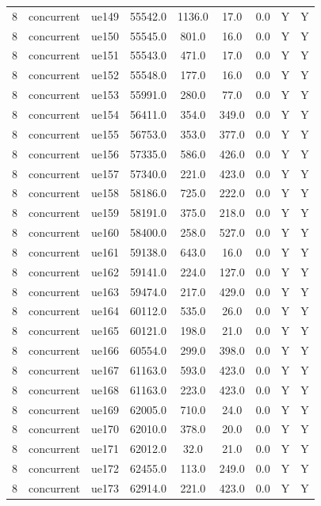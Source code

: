 \begin{table}[ht]
\begin{tabular}{|c|c|c|c|c|c|c|c|c|}
8 & concurrent & ue149 & 55542.0 & 1136.0 & 17.0 & 0.0 & Y & Y \\
8 & concurrent & ue150 & 55545.0 & 801.0 & 16.0 & 0.0 & Y & Y \\
8 & concurrent & ue151 & 55543.0 & 471.0 & 17.0 & 0.0 & Y & Y \\
8 & concurrent & ue152 & 55548.0 & 177.0 & 16.0 & 0.0 & Y & Y \\
8 & concurrent & ue153 & 55991.0 & 280.0 & 77.0 & 0.0 & Y & Y \\
8 & concurrent & ue154 & 56411.0 & 354.0 & 349.0 & 0.0 & Y & Y \\
8 & concurrent & ue155 & 56753.0 & 353.0 & 377.0 & 0.0 & Y & Y \\
8 & concurrent & ue156 & 57335.0 & 586.0 & 426.0 & 0.0 & Y & Y \\
8 & concurrent & ue157 & 57340.0 & 221.0 & 423.0 & 0.0 & Y & Y \\
8 & concurrent & ue158 & 58186.0 & 725.0 & 222.0 & 0.0 & Y & Y \\
8 & concurrent & ue159 & 58191.0 & 375.0 & 218.0 & 0.0 & Y & Y \\
8 & concurrent & ue160 & 58400.0 & 258.0 & 527.0 & 0.0 & Y & Y \\
8 & concurrent & ue161 & 59138.0 & 643.0 & 16.0 & 0.0 & Y & Y \\
8 & concurrent & ue162 & 59141.0 & 224.0 & 127.0 & 0.0 & Y & Y \\
8 & concurrent & ue163 & 59474.0 & 217.0 & 429.0 & 0.0 & Y & Y \\
8 & concurrent & ue164 & 60112.0 & 535.0 & 26.0 & 0.0 & Y & Y \\
8 & concurrent & ue165 & 60121.0 & 198.0 & 21.0 & 0.0 & Y & Y \\
8 & concurrent & ue166 & 60554.0 & 299.0 & 398.0 & 0.0 & Y & Y \\
8 & concurrent & ue167 & 61163.0 & 593.0 & 423.0 & 0.0 & Y & Y \\
8 & concurrent & ue168 & 61163.0 & 223.0 & 423.0 & 0.0 & Y & Y \\
8 & concurrent & ue169 & 62005.0 & 710.0 & 24.0 & 0.0 & Y & Y \\
8 & concurrent & ue170 & 62010.0 & 378.0 & 20.0 & 0.0 & Y & Y \\
8 & concurrent & ue171 & 62012.0 & 32.0 & 21.0 & 0.0 & Y & Y \\
8 & concurrent & ue172 & 62455.0 & 113.0 & 249.0 & 0.0 & Y & Y \\
8 & concurrent & ue173 & 62914.0 & 221.0 & 423.0 & 0.0 & Y & Y \\

\end{tabular}
\end{table}
